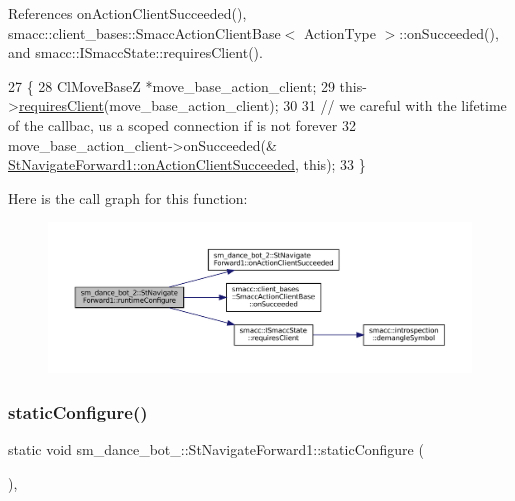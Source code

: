 References on\+Action\+Client\+Succeeded(), smacc\+::client\+\_\+bases\+::\+Smacc\+Action\+Client\+Base$<$ Action\+Type $>$\+::on\+Succeeded(), and smacc\+::\+I\+Smacc\+State\+::requires\+Client().


\begin{DoxyCode}
27   \{
28     ClMoveBaseZ *move\_base\_action\_client;
29     this->\hyperlink{classsmacc_1_1ISmaccState_a7f95c9f0a6ea2d6f18d1aec0519de4ac}{requiresClient}(move\_base\_action\_client);
30 
31     \textcolor{comment}{// we careful with the lifetime of the callbac, us a scoped connection if is not forever}
32     move\_base\_action\_client->onSucceeded(&
      \hyperlink{structsm__dance__bot__2_1_1StNavigateForward1_a6ca4d488672e844032a5ddd3a14d5942}{StNavigateForward1::onActionClientSucceeded}, \textcolor{keyword}{this});
33   \}
\end{DoxyCode}
Here is the call graph for this function\+:
\nopagebreak
\begin{figure}[H]
\begin{center}
\leavevmode
\includegraphics[width=350pt]{structsm__dance__bot__2_1_1StNavigateForward1_a2e6dc2fa60d7ef43ba41a1455bba358f_cgraph}
\end{center}
\end{figure}
\mbox{\label{structsm__dance__bot__2_1_1StNavigateForward1_a8eb2bd5bf92d72f03dac52161995cb8f}} 
\subsubsection{\texorpdfstring{static\+Configure()}{staticConfigure()}}
{\footnotesize\ttfamily static void sm\+\_\+dance\+\_\+bot\+\_\+::\+St\+Navigate\+Forward1\+::static\+Configure (\begin{DoxyParamCaption}{ }\end{DoxyParamCaption})\hspace{0.3cm}{\ttfamily [inline]}, {\ttfamily [static]}}



